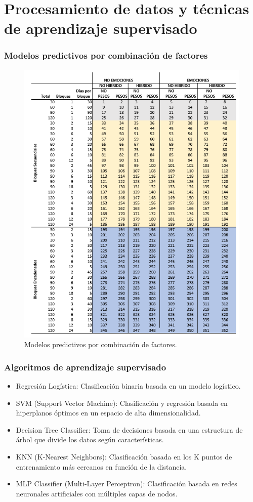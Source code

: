 \documentclass{beamer}
\begin{document}
\section{Procesamiento de datos y técnicas  de aprendizaje supervisado}
\begin{frame}
	\frametitle{Modelos predictivos por combinación de factores}
	
	\begin{figure}[H]
		\centering
		\includegraphics[width=0.5\linewidth]{figs/imagen32}
		\caption{Modelos predictivos por combinación de factores.}
		\label{fig:imagen32}
	\end{figure}
\end{frame}


\begin{frame}
	\frametitle{Algoritmos de aprendizaje supervisado}
	
	\begin{itemize}
		\item Regresión Logística: Clasificación binaria basada en un modelo logístico.
		\item SVM (Support Vector Machine): Clasificación y regresión basada en hiperplanos óptimos en un espacio de alta dimensionalidad.
		\item Decision Tree Classifier: Toma de decisiones basada en una estructura de árbol que divide los datos según características.
		\item KNN (K-Nearest Neighbors): Clasificación basada en los K puntos de entrenamiento más cercanos en función de la distancia.
		\item MLP Classifier (Multi-Layer Perceptron): Clasificación basada en redes neuronales artificiales con múltiples capas de nodos.
	\end{itemize}
	
\end{frame}
\end{document}
